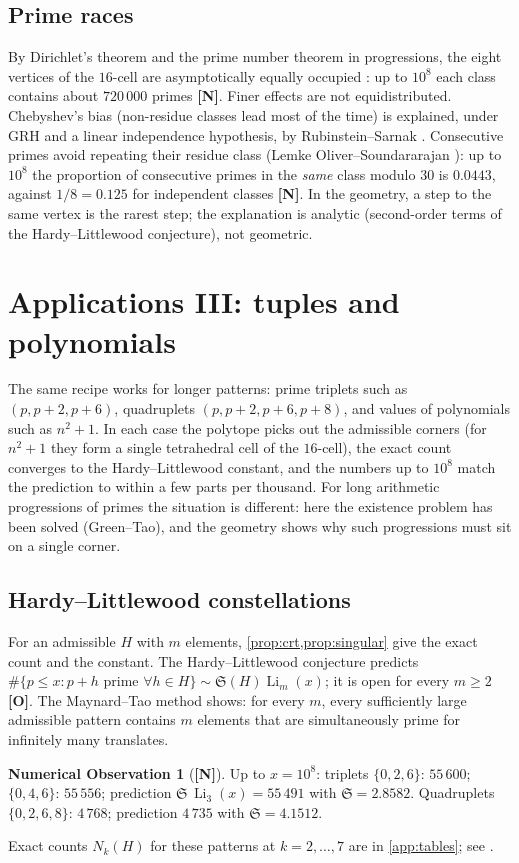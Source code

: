 \documentclass[11pt,a4paper]{article}
\newcommand{\statN}{\textsf{\textbf{[N]}}}
\newcommand{\statO}{\textsf{\textbf{[O]}}}
\theoremstyle{plain}
\theoremstyle{definition}
\newtheorem{observation}[theorem]{Numerical Observation}
\theoremstyle{remark}
\newcommand{\Li}{\operatorname{Li}}
\begin{document}
\subsection{Prime races}
By Dirichlet's theorem and the prime number theorem in progressions, the eight
vertices of the $16$-cell are asymptotically equally occupied
\cite{Dirichlet}: up to $10^8$ each class contains about $720\,000$ primes
\statN. Finer effects are not equidistributed. Chebyshev's bias (non-residue
classes lead most of the time) is explained, under GRH and a linear
independence hypothesis, by Rubinstein--Sarnak \cite{RubSarnak}. Consecutive
primes avoid repeating their residue class (Lemke Oliver--Soundararajan
\cite{LOS}): up to $10^8$ the proportion of consecutive primes in the
\emph{same} class modulo $30$ is $0.0443$, against $1/8=0.125$ for
independent classes \statN. In the geometry, a step to the same vertex is the
rarest step; the explanation is analytic (second-order terms of the
Hardy--Littlewood conjecture), not geometric.

\section{Applications III: tuples and polynomials}\label{sec:tuples}

\begin{plainwords}
The same recipe works for longer patterns: prime triplets such as
$(p,p+2,p+6)$, quadruplets $(p,p+2,p+6,p+8)$, and values of polynomials such
as $n^2+1$. In each case the polytope picks out the admissible corners (for
$n^2+1$ they form a single tetrahedral cell of the $16$-cell), the exact count
converges to the Hardy--Littlewood constant, and the numbers up to $10^8$
match the prediction to within a few parts per thousand. For long arithmetic
progressions of primes the situation is different: here the existence problem
has been solved (Green--Tao), and the geometry shows why such progressions must
sit on a single corner.
\end{plainwords}

\subsection{Hardy--Littlewood constellations}
For an admissible $H$ with $m$ elements, \cref{prop:crt,prop:singular} give the
exact count and the constant. The Hardy--Littlewood conjecture
\cite{HL} predicts $\#\{p\le x:p+h\text{ prime }\forall h\in H\}\sim\mathfrak
S(H)\Li_m(x)$; it is open for every $m\ge2$ \statO. The Maynard--Tao method
\cite{Maynard} shows: for every $m$, every sufficiently large admissible pattern
contains $m$ elements that are simultaneously prime for infinitely many
translates.
\begin{observation}[\statN]
Up to $x=10^8$: triplets $\{0,2,6\}$: $55\,600$; $\{0,4,6\}$: $55\,556$;
prediction $\mathfrak S\,\Li_3(x)=55\,491$ with $\mathfrak S=2.8582$.
Quadruplets $\{0,2,6,8\}$: $4\,768$; prediction $4\,735$ with
$\mathfrak S=4.1512$.
\end{observation}
Exact counts $N_k(H)$ for these patterns at $k=2,\dots,7$ are in
\cref{app:tables}; see \cite{K-hl}.
\end{document}
